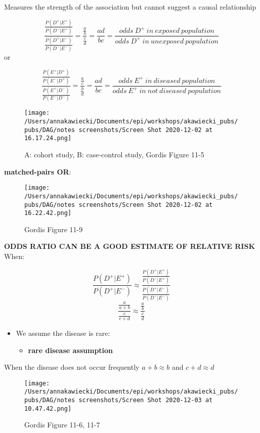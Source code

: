 \documentclass[
]{article}
\providecommand{\tightlist}{%
  \setlength{\itemsep}{0pt}\setlength{\parskip}{0pt}}
\begin{document}
Measures the strength of the association but cannot suggest a causal
relationship

\[\frac{\frac{P(D^+|E^+)}{P(D^-|E^+)}}{\frac{P(D^+|E^-)}{P(D^-|E^-)}}=\frac{\frac{a}{b}}{\frac{c}{d}}=\frac{ad}{bc}=\frac{odds\:D^+\:in\:exposed\:population}{odds\:D^+\:in\:unexposed\:population}\]
or

\[\frac{\frac{P(E^+|D^+)}{P(E^-|D^+)}}{\frac{P(E^+|D^-)}{P(E^-|D^-)}}=\frac{\frac{a}{c}}{\frac{b}{d}}=\frac{ad}{bc}=\frac{odds\:E^+\:in\:diseased\:population}{odds\:E^+\:in\:not\:diseased\:population}\]

\begin{figure}
\centering
\texttt{[image: /Users/annakawiecki/Documents/epi/workshops/akawiecki\_pubs/pubs/DAG/notes screenshots/Screen Shot 2020-12-02 at 16.17.24.png]}
\caption{A: cohort study, B: case-control study, Gordis Figure 11-5}
\end{figure}

\textbf{matched-pairs OR}:

\begin{figure}
\centering
\texttt{[image: /Users/annakawiecki/Documents/epi/workshops/akawiecki\_pubs/pubs/DAG/notes screenshots/Screen Shot 2020-12-02 at 16.22.42.png]}
\caption{Gordis Figure 11-9}
\end{figure}

\textbf{ODDS RATIO CAN BE A GOOD ESTIMATE OF RELATIVE RISK} When:

\[\frac{P(D^+|E^+)}{P(D^+|E^-)}\approx\frac{\frac{P(D^+|E^+)}{P(D^-|E^+)}}{\frac{P(D^+|E^-)}{P(D^-|E^-)}}\]
\[\frac{\frac{a}{a+b}}{\frac{c}{c+d}} \approx \frac{\frac{a}{b}}{\frac{c}{d}}\]

\begin{itemize}
\tightlist
\item
  We assume the disease is rare:

  \begin{itemize}
  \tightlist
  \item
    \textbf{rare disease assumption}
  \end{itemize}
\end{itemize}

When the disease does not occur frequently \(a+b \approx b\) and
\(c+d \approx d\)

\begin{figure}
\centering
\texttt{[image: /Users/annakawiecki/Documents/epi/workshops/akawiecki\_pubs/pubs/DAG/notes screenshots/Screen Shot 2020-12-03 at 10.47.42.png]}
\caption{Gordis Figure 11-6, 11-7}
\end{figure}
\end{document}
